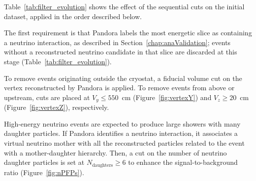Table~\ref{tab:filter_evolution} shows the effect of the sequential cuts on the initial dataset, applied in the order described below.

The first requirement is that Pandora labels the most energetic slice as containing a neutrino interaction, as described in Section~\ref{chap:anaValidation}; events without a reconstructed neutrino candidate in that slice are discarded at this stage (Table~\ref{tab:filter_evolution}).

To remove events originating outside the cryostat, a fiducial volume cut on the vertex reconstructed by Pandora is applied. To remove events from above or upstream, cuts are placed at $V_y \leq 550$~cm (Figure~\ref{fig:vertexY}) and $V_z \geq 20$~cm (Figure~\ref{fig:vertexZ}), respectively.

High-energy neutrino events are expected to produce large showers with many daughter particles. If Pandora identifies a neutrino interaction, it associates a virtual neutrino mother with all the reconstructed particles related to the event with a mother-daughter hierarchy. Then, a cut on the number of neutrino daughter particles is set at $N_{\text{daughters}} \geq 6$ to enhance the signal-to-background ratio (Figure~\ref{fig:nPFPs}).

